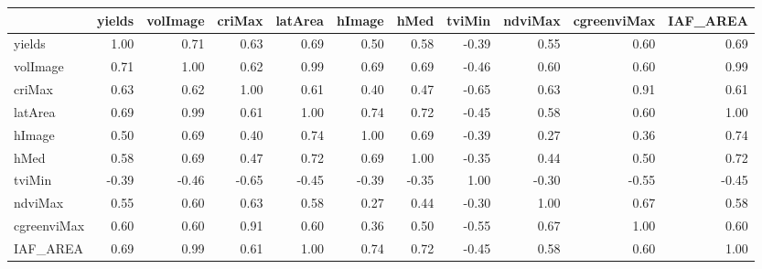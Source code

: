 \begin{tabular}{lrrrrrrrrrr}
\toprule
{} &  yields &  volImage &  criMax &  latArea &  hImage &  hMed &  tviMin &  ndviMax &  cgreenviMax &  IAF\_AREA \\
\midrule
yields      &    1.00 &      0.71 &    0.63 &     0.69 &    0.50 &  0.58 &   -0.39 &     0.55 &         0.60 &      0.69 \\
volImage    &    0.71 &      1.00 &    0.62 &     0.99 &    0.69 &  0.69 &   -0.46 &     0.60 &         0.60 &      0.99 \\
criMax      &    0.63 &      0.62 &    1.00 &     0.61 &    0.40 &  0.47 &   -0.65 &     0.63 &         0.91 &      0.61 \\
latArea     &    0.69 &      0.99 &    0.61 &     1.00 &    0.74 &  0.72 &   -0.45 &     0.58 &         0.60 &      1.00 \\
hImage      &    0.50 &      0.69 &    0.40 &     0.74 &    1.00 &  0.69 &   -0.39 &     0.27 &         0.36 &      0.74 \\
hMed        &    0.58 &      0.69 &    0.47 &     0.72 &    0.69 &  1.00 &   -0.35 &     0.44 &         0.50 &      0.72 \\
tviMin      &   -0.39 &     -0.46 &   -0.65 &    -0.45 &   -0.39 & -0.35 &    1.00 &    -0.30 &        -0.55 &     -0.45 \\
ndviMax     &    0.55 &      0.60 &    0.63 &     0.58 &    0.27 &  0.44 &   -0.30 &     1.00 &         0.67 &      0.58 \\
cgreenviMax &    0.60 &      0.60 &    0.91 &     0.60 &    0.36 &  0.50 &   -0.55 &     0.67 &         1.00 &      0.60 \\
IAF\_AREA    &    0.69 &      0.99 &    0.61 &     1.00 &    0.74 &  0.72 &   -0.45 &     0.58 &         0.60 &      1.00 \\
\bottomrule
\end{tabular}
